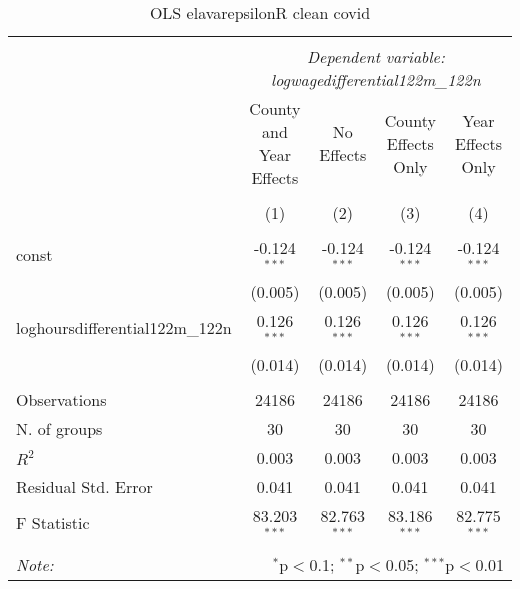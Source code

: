 \documentclass{report}
\begin{document}
\begin{table}[!htbp] \centering
  \caption{OLS elavarepsilonR  clean covid}
\begin{tabular}{@{\extracolsep{5pt}}lcccc}
\\[-1.8ex]\hline
\hline \\[-1.8ex]
& \multicolumn{4}{c}{\textit{Dependent variable: logwagedifferential122m_122n}} \
\cr \cline{2-5}
\\[-1.8ex] & \multicolumn{1}{c}{County and Year Effects} & \multicolumn{1}{c}{No Effects} & \multicolumn{1}{c}{County Effects Only} & \multicolumn{1}{c}{Year Effects Only}  \\
\\[-1.8ex] & (1) & (2) & (3) & (4) \\
\hline \\[-1.8ex]
 const & -0.124$^{***}$ & -0.124$^{***}$ & -0.124$^{***}$ & -0.124$^{***}$ \\
& (0.005) & (0.005) & (0.005) & (0.005) \\
 loghoursdifferential122m_122n & 0.126$^{***}$ & 0.126$^{***}$ & 0.126$^{***}$ & 0.126$^{***}$ \\
& (0.014) & (0.014) & (0.014) & (0.014) \\
\hline \\[-1.8ex]
 Observations & 24186 & 24186 & 24186 & 24186 \\
 N. of groups & 30 & 30 & 30 & 30 \\
 $R^2$ & 0.003 & 0.003 & 0.003 & 0.003 \\
 Residual Std. Error & 0.041 & 0.041 & 0.041 & 0.041 \\
 F Statistic & 83.203$^{***}$ & 82.763$^{***}$ & 83.186$^{***}$ & 82.775$^{***}$ \\
\hline
\hline \\[-1.8ex]
\textit{Note:} & \multicolumn{4}{r}{$^{*}$p$<$0.1; $^{**}$p$<$0.05; $^{***}$p$<$0.01} \\
\end{tabular}
\end{table}
\end{document}
